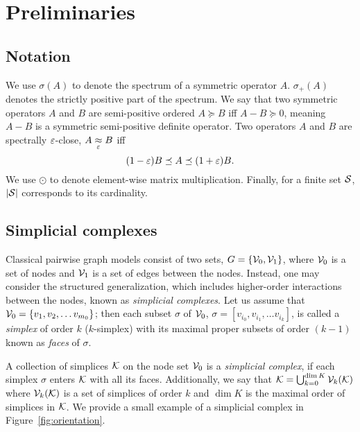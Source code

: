 



\section{Preliminaries}
\label{sec:SC}

\subsection{ Notation }
We use \( \sigma(A )\) to denote the spectrum of a symmetric operator \( A \). \( \sigma_+(A )\) denotes the strictly positive part of the spectrum.
We say that two symmetric operators \( A \) and \( B \) are semi-positive ordered \( A \succeq B \) iff \( A - B  \succeq 0 \), meaning \( A - B \) is a symmetric semi-positive definite operator.
Two operators \( A \) and \( B \) are spectrally \( \varepsilon \)-close, \( A \underset{\varepsilon}{\approx} B \) iff 
      \begin{equation*}
            ( 1 - \varepsilon ) B \preceq A \preceq ( 1 + \varepsilon ) B.     
      \end{equation*}
We use \(\odot \) to denote element-wise matrix multiplication.
Finally, for a finite set \( \mathcal{S} \),  \( | \mathcal{S} | \) corresponds to its cardinality.


\subsection{Simplicial complexes}

Classical pairwise graph models consist of two sets, \( G =\{ \mathcal{V}_0, \mathcal{V}_1 \} \), where \( \mathcal{V}_0 \) is a set of nodes and \( \mathcal{V}_1 \) is a set of edges between the nodes. Instead, one may consider the structured generalization, which includes higher-order interactions between the nodes, known as \emph{simplicial complexes}. Let us assume that \( \mathcal{V}_0 = \{ v_1, v_2, \dots v_{m_0}\}\); then each subset \( \sigma \) of \( \mathcal{V}_0 \), \( \sigma = [ v_{i_0}, v_{i_1}, \dots v_{i_k} ]\), is called a \emph{simplex} of order \( k \) (\(k\)-simplex) with its maximal proper subsets of order \( ( k - 1 ) \) known as \emph{faces} of \( \sigma \). 
\begin{definition}
      A collection of simplices \( \mathcal{K} \) on the node set \( \mathcal{V}_0 \) is a \emph{simplicial complex}, if each simplex \( \sigma \) enters \( \mathcal{K} \) with all its faces. Additionally, we say that \( \mathcal{K} = \bigcup_{k=0}^{\dim K} \mathcal{V}_{k}(\mathcal{K}) \) where \( \mathcal{V}_{k}(\mathcal{K}) \) is a set of simplices of order \( k \) and \( \dim K \) is the maximal order of simplices in \( \mathcal{K} \). We provide a small example of a simplicial complex in Figure~\ref{fig:orientation}.
\end{definition}

